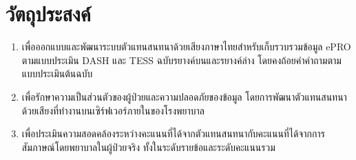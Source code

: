 \section{วัตถุประสงค์}
\label{sec:objectives}

\begin{enumerate}
    \item เพื่อออกแบบและพัฒนาระบบตัวแทนสนทนาด้วยเสียงภาษาไทยสำหรับเก็บรวบรวมข้อมูล ePRO ตามแบบประเมิน DASH และ TESS ฉบับรยางค์บนและรยางค์ล่าง โดยคงถ้อยคำคำถามตามแบบประเมินต้นฉบับ
    \item เพื่อรักษาความเป็นส่วนตัวของผู้ป่วยและความปลอดภัยของข้อมูล โดยการพัฒนาตัวแทนสนทนาด้วยเสียงที่ทำงานบนเซิร์ฟเวอร์ภายในของโรงพยาบาล
    \item เพื่อประเมินความสอดคล้องระหว่างคะแนนที่ได้จากตัวแทนสนทนากับคะแนนที่ได้จากการสัมภาษณ์โดยพยาบาลในผู้ป่วยจริง ทั้งในระดับรายข้อและระดับคะแนนรวม
\end{enumerate}
